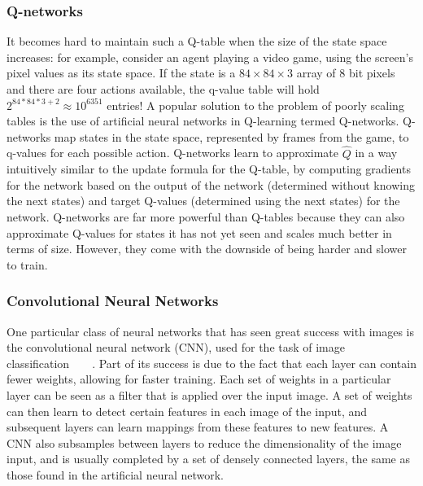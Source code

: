 \documentclass[twocolumn]{article}
\begin{document}
	\subsubsection*{Q-networks}
	It becomes hard to maintain such a Q-table when the size of the state space 
	increases: for example, consider an agent playing a video game, using the 
	screen's pixel values as its state space. If the state is a $84 \times 84 
	\times 3$ array of $8$ bit pixels and there are four actions available, the 
	q-value table will hold $2^{84*84*3+2} \approx 10^{6351}$ entries! A 
	popular solution to the problem of poorly scaling tables is the use of 
	artificial neural networks in Q-learning termed Q-networks. 
	Q-networks map states in the state space, represented by frames from the 
	game, to q-values for each possible action. Q-networks learn to approximate 
	$\hat{Q}$ in a way intuitively similar to the update formula for the 
	Q-table, by computing gradients for the network based on the output of the 
	network (determined without knowing the next states) and target Q-values 
	(determined using the next states) for the network. Q-networks are far more 
	powerful than Q-tables because they can also approximate Q-values for 
	states it has not yet seen and scales much better in terms of size. 
	However, they come with the downside of being harder and slower to 
	train.\\
	
	\subsubsection*{Convolutional Neural Networks}
	One particular class of neural networks that has seen great success with 
	images is the convolutional neural network (CNN), used for the task of 
	image 	
	classification~\cite{Krizhevsky}~\cite{Zeiler}~\cite{Simonyan}~\cite{Szegedy}.
	Part of its success is due to the fact that each layer can contain fewer 
	weights, allowing for faster training. Each set of weights in a particular 
	layer can be seen as a filter that is applied over the input image. A set 
	of weights can then learn to detect certain features in each image of the 
	input, and subsequent layers can learn mappings from these features to new 
	features. A CNN also subsamples between layers to reduce the dimensionality 
	of the image input, and is usually completed by a set of densely connected 
	layers, the same as those found in the artificial neural network. \\
	
\end{document}
